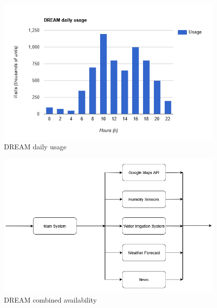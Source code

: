 \documentclass[table, 12pt]{article}
\begin{document}
\begin{center}
    \begin{figure}[!h]
        \includegraphics[scale=0.60, center]{assets/bar-graph-daily-usage.png}
        \caption{DREAM daily usage}
        \label{fig: daily_usage}
    \end{figure}
\end{center}

\begin{center}
    \begin{figure}[!h]
        \includegraphics[scale=0.65, center]{assets/availability.png}
        \caption{DREAM combined availability}
        \label{fig: availability}
    \end{figure}
\end{center}
\end{document}
